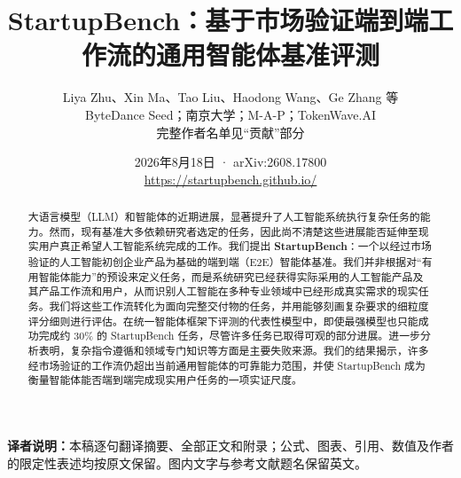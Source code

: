\documentclass[UTF8,fontset=none,10pt,twocolumn]{ctexart}
\title{\bfseries StartupBench：基于市场验证端到端工作流的通用智能体基准评测}
\author{Liya Zhu、Xin Ma、Tao Liu、Haodong Wang、Ge Zhang 等\\
\small ByteDance Seed；南京大学；M-A-P；TokenWave.AI\\
\small 完整作者名单见“贡献”部分}
\date{2026年8月18日 · arXiv:2608.17800\\\url{https://startupbench.github.io/}}
\begin{document}
\maketitle

\begin{abstract}
大语言模型（LLM）和智能体的近期进展，显著提升了人工智能系统执行复杂任务的能力。然而，现有基准大多依赖研究者选定的任务，因此尚不清楚这些进展能否延伸至现实用户真正希望人工智能系统完成的工作。我们提出 \textbf{StartupBench}：一个以经过市场验证的人工智能初创企业产品为基础的端到端（E2E）智能体基准。我们并非根据对“有用智能体能力”的预设来定义任务，而是系统研究已经获得实际采用的人工智能产品及其产品工作流和用户，从而识别人工智能在多种专业领域中已经形成真实需求的现实任务。我们将这些工作流转化为面向完整交付物的任务，并用能够刻画复杂要求的细粒度评分细则进行评估。在统一智能体框架下评测的代表性模型中，即使最强模型也只能成功完成约 30\% 的 StartupBench 任务，尽管许多任务已取得可观的部分进展。进一步分析表明，复杂指令遵循和领域专门知识等方面是主要失败来源。我们的结果揭示，许多经市场验证的工作流仍超出当前通用智能体的可靠能力范围，并使 StartupBench 成为衡量智能体能否端到端完成现实用户任务的一项实证尺度。
\end{abstract}

\noindent\textbf{译者说明：}本稿逐句翻译摘要、全部正文和附录；公式、图表、引用、数值及作者的限定性表述均按原文保留。图内文字与参考文献题名保留英文。






\clearpage



\clearpage
\appendix

\end{document}

